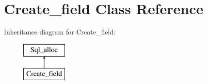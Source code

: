 \hypertarget{classCreate__field}{}\section{Create\+\_\+field Class Reference}
\label{classCreate__field}
Inheritance diagram for Create\+\_\+field\+:\begin{figure}[H]
\begin{center}
\leavevmode
\includegraphics[height=2.000000cm]{classCreate__field}
\end{center}
\end{figure}
